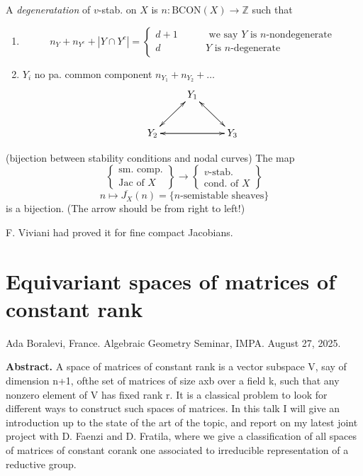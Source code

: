 \begin{definition}
\label{definition-n-degeneracy}
A {\it degeneratation} of $v$-stab. on $X$ is $n:\text{BCON}(X) \to \mathbb{Z}$
such that
\begin{enumerate}
\item 
$$
n_Y+n_{Y^c}+|Y \cap Y^c|=
\begin{cases}
d+1\qquad &\text{ we say $Y$ is $n$-nondegenerate} \\
d\qquad &\text{$Y$ is $n$-degenerate}
\end{cases}
$$
\item $Y_i$ no pa. common component $n_{Y_1}+n_{Y_2}+\ldots$
$$
\xymatrix{
&Y_1\ar[dr]\ar[dl]\\
Y_2\ar[ur]\ar[rr]&&Y_3\ar[ll]\ar[ul]
}
$$
\end{enumerate}
\end{definition}

\begin{theorem}[-, et al]
\label{theorem-bijection-stability-conditions-and-nodal-curves}
(bijection between stability conditions and nodal curves) The map
$$
\left\{ \substack{\text{sm. comp.} \\ \text{Jac of $X$}} \right\} \to
\left\{ \substack{\text{$v$-stab.} \\ \text{cond. of $X$}} \right\} 
$$
$$
n\mapsto \overline{J_X}(n)=\{n\text{-semistable sheaves}\}
$$
is a bijection. (The arrow should be from right to left!)
\end{theorem}

F. Viviani had proved it for fine compact Jacobians.

\section{Equivariant spaces of matrices of constant rank}
\label{section-equivariant-spaces-of-matrices-of-constant-rank}

\noindent
Ada Boralevi, France.
Algebraic Geometry Seminar, IMPA. 
August 27, 2025.

\medskip
{\bf Abstract.} A space of matrices of constant rank is a vector subspace V, say
of dimension n+1, ofthe set of matrices of size axb over a field k, such that
any nonzero element of V has fixed rank r. It is a classical problem to look for
different ways to construct such spaces of matrices. In this talk I will give an
introduction up to the state of the art of the topic, and report on my latest
joint project with D. Faenzi and D. Fratila, where we give a classification of
all spaces of matrices of constant corank one associated to irreducible
representation of a reductive group.

